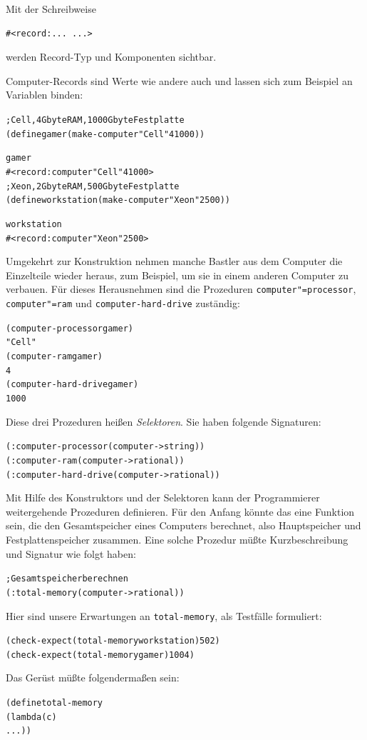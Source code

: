 Mit der Schreibweise
%
\begin{verbatim}
#<record:... ...>
\end{verbatim}
%
werden Record-Typ und Komponenten sichtbar.

Computer-Records sind Werte wie andere auch und lassen sich zum Beispiel an
Variablen binden:
%
\begin{alltt}
; Cell, 4 Gbyte RAM, 1000 Gbyte Festplatte
(define gamer (make-computer "Cell" 4 1000))

gamer
\evalsto{} #<record:computer "Cell" 4 1000>
; Xeon, 2 Gbyte RAM, 500 Gbyte Festplatte
(define workstation (make-computer "Xeon" 2 500))

workstation
\evalsto{} #<record:computer "Xeon" 2 500>
\end{alltt}
%
Umgekehrt zur Konstruktion nehmen manche Bastler aus dem Computer die
Einzelteile wieder heraus, zum Beispiel, um sie in einem anderen
Computer zu verbauen. Für dieses Herausnehmen sind die Prozeduren
\texttt{computer"=processor}, \texttt{computer"=ram} und
\texttt{computer-hard-drive} zuständig:
%
\begin{alltt}
(computer-processor gamer)
\evalsto{} "Cell"
(computer-ram gamer)
\evalsto{} 4
(computer-hard-drive gamer)
\evalsto{} 1000
\end{alltt}
%
Diese drei Prozeduren heißen \textit{Selektoren}.  Sie haben
folgende Signaturen:
%
\begin{alltt}
(: computer-processor (computer -> string))
(: computer-ram (computer -> rational))
(: computer-hard-drive (computer -> rational))
\end{alltt}
%
Mit Hilfe des Konstruktors und der Selektoren kann der Programmierer
weitergehende Prozeduren definieren.  Für den Anfang könnte das
eine Funktion sein, die den Gesamtspeicher eines Computers berechnet,
also Hauptspeicher und Festplattenspeicher zusammen.
Eine solche Prozedur müßte Kurzbeschreibung und Signatur wie folgt haben:
%
\begin{alltt}
; Gesamtspeicher berechnen
(: total-memory (computer -> rational))
\end{alltt}
%
Hier sind unsere Erwartungen an \texttt{total-memory}, als Testfälle
formuliert:
%
\begin{alltt}
(check-expect (total-memory workstation) 502)
(check-expect (total-memory gamer) 1004)
\end{alltt}
% 
Das Gerüst müßte folgendermaßen sein:
%
\begin{alltt}
(define total-memory
  (lambda (c)
    ...))
\end{alltt}
